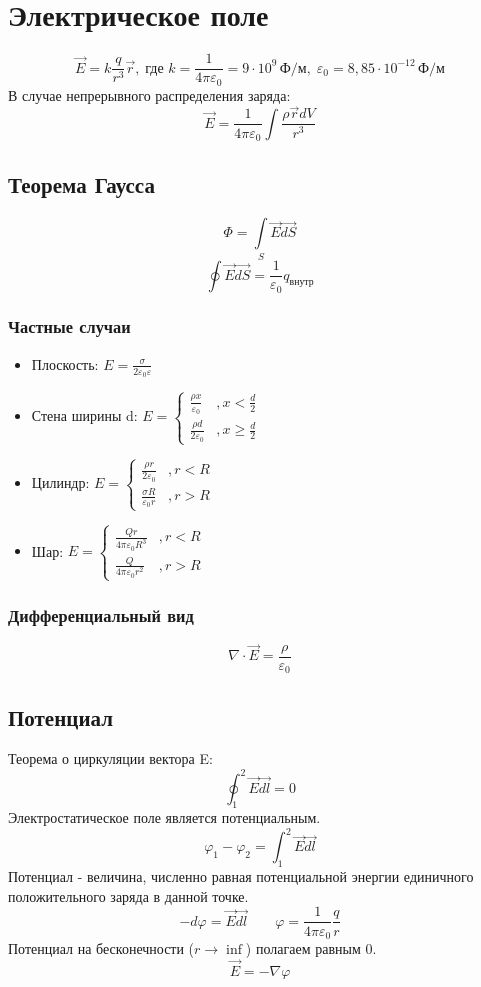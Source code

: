 \documentclass{article}
\begin{document}
\tableofcontents

\section{Электрическое поле}
\[
    \vec{E} = k\frac{q}{r^3}\vec{r} ,\;\text{где }
    k=\frac{1}{4\pi\varepsilon_0}=9\cdot10^9 \,\text{Ф/м} ,\;
    \varepsilon_{0} = 8,85\cdot10^{-12} \,\text{Ф/м}
\]
В случае непрерывного распределения заряда:
\[\vec{E} = \frac{1}{4\pi\varepsilon_0}\int\frac{\rho\vec{r}dV}{r^3}\]

\subsection{Теорема Гаусса}
\[\Phi=\int\limits_{S}\vec{E}\vec{dS}\]
\[\oint\vec{E}\vec{dS}=\frac{1}{\varepsilon_{0}}q_\text{внутр}\]
\subsubsection{Частные случаи}
\begin{itemize}
    \item Плоскость: $E=\frac{\sigma}{2\varepsilon_{0}\varepsilon}$
    \item Стена ширины d: $E=\begin{cases}
                  \frac{\rho x}{\varepsilon_{0}}   & ,x<\frac{d}{2}   \\
                  \frac{\rho d}{2\varepsilon_{0}} & ,x\ge\frac{d}{2}
              \end{cases}$
    \item Цилиндр: $E=\begin{cases}
        \frac{\rho r}{2 \varepsilon_0} & ,r<R \\
        \frac{\sigma R}{\varepsilon_0 r} & ,r>R
    \end{cases}$
    \item Шар: $E=\begin{cases}
                  \frac{Qr}{4\pi\varepsilon_{0}R^3}  & ,r<R \\
                  \frac{Q}{4\pi\varepsilon_{0}r^{2}} & ,r>R
              \end{cases}$
\end{itemize}
\subsubsection{Дифференциальный вид}
\[\nabla\cdot\vec{E}=\frac{\rho}{\varepsilon_{0}}\]

\subsection{Потенциал}
Теорема о циркуляции вектора E:
\[\oint_{1}^{2}\vec{E}\vec{dl}=0\]
Электростатическое поле является потенциальным.
\[\varphi_{1}-\varphi_{2}=\int_{1}^{2}\vec{E}\vec{dl}\]
Потенциал - величина, численно равная потенциальной энергии единичного положительного заряда в данной точке.
\[
    -d\varphi=\vec{E}\vec{dl} \qquad
    \varphi=\frac{1}{4\pi\varepsilon_{0}}\frac{q}{r}
\]
Потенциал на бесконечности ($r\to\inf$) полагаем равным 0.
\[\vec{E}=-\nabla\varphi\]
\end{document}
